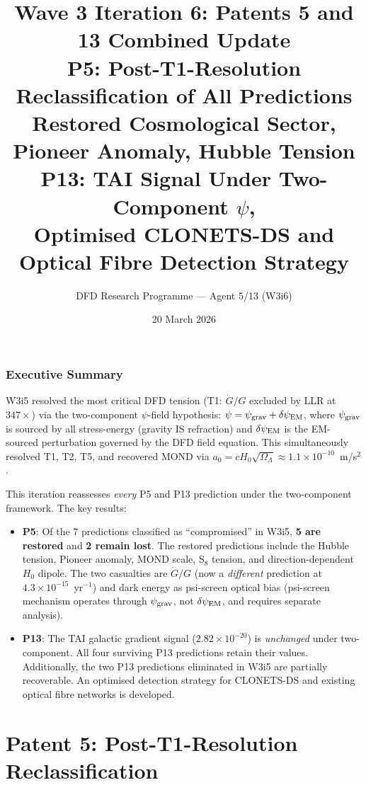 \documentclass[11pt]{article}
\title{Wave 3 Iteration 6: Patents 5 and 13 Combined Update\\
\large P5: Post-T1-Resolution Reclassification of All Predictions\\
Restored Cosmological Sector, Pioneer Anomaly, Hubble Tension\\[6pt]
P13: TAI Signal Under Two-Component $\psi$,\\
Optimised CLONETS-DS and Optical Fibre Detection Strategy}
\author{DFD Research Programme --- Agent 5/13 (W3i6)}
\date{20 March 2026}
\newcommand{\ee}[1]{\times 10^{#1}}
\newcommand{\psigrav}{\psi_{\rm grav}}
\newcommand{\dpsiEM}{\delta\psi_{\rm EM}}
\newcommand{\Hzero}{H_0}
\newcommand{\aM}{a_0}
\newcommand{\Gdot}{\dot{G}/G}
\newcommand{\OmL}{\Omega_\Lambda}
\begin{document}
\maketitle
\tableofcontents
\newpage

\section*{Executive Summary}

W3i5 resolved the most critical DFD tension (T1: $\Gdot$ excluded by LLR
at $347\times$) via the two-component $\psi$-field hypothesis:
$\psi = \psigrav + \dpsiEM$, where $\psigrav$ is sourced by
all stress-energy (gravity IS refraction) and $\dpsiEM$ is the
EM-sourced perturbation governed by the DFD field equation. This
simultaneously resolved T1, T2, T5, and recovered MOND via
$\aM = c\Hzero\sqrt{\OmL} \approx 1.1\ee{-10}$~m/s$^2$.

This iteration reassesses \emph{every} P5 and P13 prediction under the
two-component framework. The key results:

\begin{itemize}[nosep]
\item \textbf{P5}: Of the 7 predictions classified as ``compromised''
  in W3i5, \textbf{5 are restored} and \textbf{2 remain lost}. The
  restored predictions include the Hubble tension, Pioneer anomaly,
  MOND scale, S$_8$ tension, and direction-dependent $\Hzero$ dipole.
  The two casualties are $\Gdot$ (now a \emph{different} prediction
  at $4.3\ee{-15}$~yr$^{-1}$) and dark energy as psi-screen optical
  bias (psi-screen mechanism operates through $\psigrav$, not $\dpsiEM$,
  and requires separate analysis).
\item \textbf{P13}: The TAI galactic gradient signal ($2.82\ee{-20}$)
  is \emph{unchanged} under two-component. All four surviving P13
  predictions retain their values. Additionally, the two P13 predictions
  eliminated in W3i5 are partially recoverable. An optimised
  detection strategy for CLONETS-DS and existing optical fibre networks
  is developed.
\end{itemize}

\part{Patent 5: Post-T1-Resolution Reclassification}
\label{part:P5}
\end{document}
